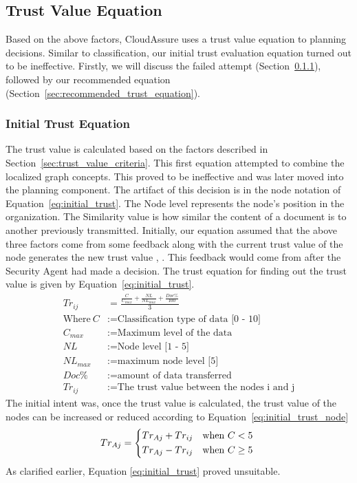 \subsection{Trust Value Equation}
Based on the above factors, CloudAssure uses a trust value equation to planning 
decisions. Similar to classification, our initial trust evaluation equation
turned out to be ineffective. Firstly, we will discuss the failed attempt
(Section~\ref{sec:initial_trust_equation}), followed by our recommended equation
(Section~\ref{sec:recommended_trust_equation}). 

\subsubsection{Initial Trust Equation}
\label{sec:initial_trust_equation}
The trust value is calculated based on the factors described in
Section~\ref{sec:trust_value_criteria}. This first equation attempted to combine
the localized graph concepts. This
proved to be ineffective and was later moved into the planning component. The
artifact of this decision is in the node notation of
Equation~\ref{eq:initial_trust}. 
The Node level represents the node's
position in the organization. The Similarity value is how similar the content of
a document is to another previously transmitted.  Initially, our equation
assumed that the above three factors come from some
feedback along with the current trust value of the node generates the new trust
value \autocite{L.Xiong2004}, \autocite{YanWang2007}. This feedback would come
from after the Security Agent had made a decision. The trust equation for
finding out the trust value is given by Equation~\ref{eq:initial_trust}.
\begin{equation}
    \begin{aligned}
         Tr_{ij}&=\frac{\frac{C}{C_{max}} + \frac{NL}{NL_{max}} + \frac{Doc\%}{100}}{3} \\
    \text{Where}~C &:= \text{Classification type of data [0 - 10]} \\
C_{max} &:= \text{Maximum level of the data} \\
NL &:= \text{Node level [1 - 5]} \\
NL_{max} &:= \text{maximum node level [5]} \\
Doc\% &:= \text{amount of data transferred} \\
Tr_{ij} &:= \text{The trust value between the nodes i and j}
    \label{eq:initial_trust}
\end{aligned}
\end{equation}
The initial intent was, once the trust value is calculated, the trust
value of the nodes can be increased or reduced according to
Equation~\ref{eq:initial_trust_node}
\begin{equation}
   Tr_{Aj} =    \begin{dcases*}
                    Tr_{Aj} + Tr_{ij} & when $C < 5$\\
                    Tr_{Aj} - Tr_{ij} & when $C \ge 5$
                \end{dcases*}
                \label{eq:initial_trust_node}
\end{equation}
As clarified earlier, Equation \ref{eq:initial_trust} proved unsuitable.

